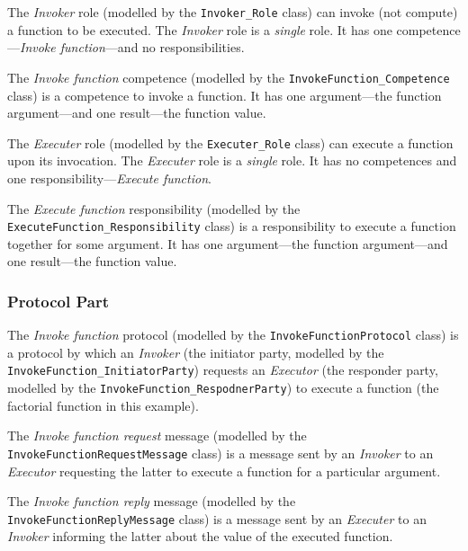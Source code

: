 The \textit{Invoker} role (modelled by the \texttt{Invoker\_Role} class) can invoke (not compute) a function to be executed.
The \textit{Invoker} role is a \textit{single} role.
It has one competence---\textit{Invoke function}---and no responsibilities.

The \textit{Invoke function} competence (modelled by the \texttt{InvokeFunction\_Competence} class) is a competence to invoke a function.
It has one argument---the function argument---and one result---the function value. 

The \textit{Executer} role (modelled by the \texttt{Executer\_Role} class) can execute a function upon its invocation.
The \textit{Executer} role is a \textit{single} role.
It has no competences and one responsibility---\textit{Execute function}.

The \textit{Execute function} responsibility (modelled by the \texttt{ExecuteFunction\_Responsibility} class) is a responsibility to execute a function together for some argument.
It has one argument---the function argument---and one result---the function value.

\subsubsection*{Protocol Part}

The \textit{Invoke function} protocol (modelled by the \texttt{InvokeFunctionProtocol} class) is a protocol by which an \textit{Invoker} (the initiator party, modelled by the \texttt{InvokeFunction\_InitiatorParty}) requests an \textit{Executor} (the responder party, modelled by the \texttt{InvokeFunction\_RespodnerParty}) to execute a function (the factorial function in this example).

The \textit{Invoke function request} message (modelled by the \texttt{InvokeFunctionRequestMessage} class) is a message sent by an \textit{Invoker} to an \textit{Executor} requesting the latter to execute a function for a particular argument.

The \textit{Invoke function reply} message (modelled by the \texttt{InvokeFunctionReplyMessage} class) is a message sent by an \textit{Executer} to an \textit{Invoker} informing the latter about the value of the executed function.

